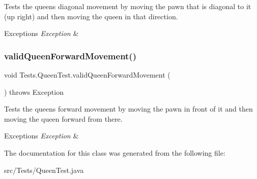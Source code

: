 Tests the queen\textquotesingle{}s diagonal movement by moving the pawn that is diagonal to it (up right) and then moving the queen in that direction. 
\begin{DoxyExceptions}{Exceptions}
{\em Exception} & \\
\hline
\end{DoxyExceptions}
\hypertarget{class_tests_1_1_queen_test_a8bec252c50587e572eaf3d36fb719d6f}{}\label{class_tests_1_1_queen_test_a8bec252c50587e572eaf3d36fb719d6f} 
\subsubsection{\texorpdfstring{valid\+Queen\+Forward\+Movement()}{validQueenForwardMovement()}}
{\footnotesize\ttfamily void Tests.\+Queen\+Test.\+valid\+Queen\+Forward\+Movement (\begin{DoxyParamCaption}{ }\end{DoxyParamCaption}) throws Exception}

Tests the queen\textquotesingle{}s forward movement by moving the pawn in front of it and then moving the queen forward from there. 
\begin{DoxyExceptions}{Exceptions}
{\em Exception} & \\
\hline
\end{DoxyExceptions}


The documentation for this class was generated from the following file\+:\begin{DoxyCompactItemize}
\item 
src/\+Tests/Queen\+Test.\+java\end{DoxyCompactItemize}
